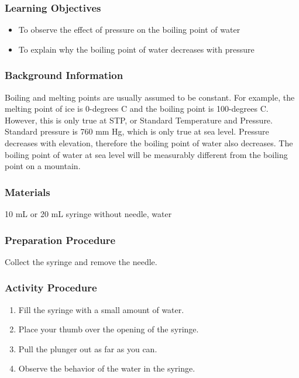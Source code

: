 \subsubsection*{Learning Objectives}
\begin{itemize}
\item{To observe the effect of pressure on the boiling point of water} 
\item{To explain why the boiling point of water decreases with pressure} 
\end{itemize}

\subsubsection*{Background Information}
Boiling and melting points are usually assumed to be constant. For example, the melting point of ice is 0-degrees C and the boiling point is 100-degrees C. However, this is only true at STP, or Standard Temperature and Pressure. Standard pressure is 760 mm Hg, which is only true at sea level. Pressure decreases with elevation, therefore the boiling point of water also decreases. The boiling point of water at sea level will be measurably different from the boiling point on a mountain.  

\subsubsection*{Materials}
10 mL or 20 mL syringe without needle, water

\subsubsection*{Preparation Procedure}
Collect the syringe and remove the needle.

\subsubsection*{Activity Procedure}
\begin{enumerate}
\item{Fill the syringe with a small amount of water.} 
\item{Place your thumb over the opening of the syringe.} 
\item{Pull the plunger out as far as you can.} 
\item{Observe the behavior of the water in the syringe.} 
\end{enumerate}

